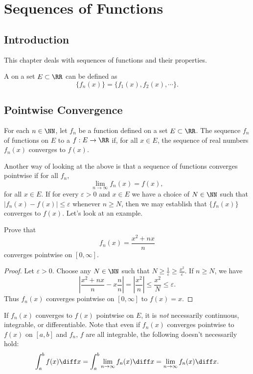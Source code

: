 \chapter{Sequences of Functions}

\section{Introduction}
This chapter deals with sequences of functions and their properties. 
\begin{definition}
	A  on a set $E \subset \RR$ can be defined as 
	\[ \{f_n(x)\} = \{f_1(x), f_2(x), \cdots \}. \]
\end{definition}
\section{Pointwise Convergence}

\begin{definition}
	For each $n \in \NN$, let $f_n$ be a function defined on a set $E \subset \RR$. The sequence $f_n$ of functions  on $E$ to a  $f: E \to \RR$ if, for all $x \in E$, the sequence of real numbers $f_n(x)$ converges to $f(x)$.
\end{definition}

Another way of looking at the above is that a sequence of functions converges pointwise if for all $f_n$, 
\[ \lim_{n\to\infty} f_n(x) = f(x), \] for all $x \in E$. If for every $\varepsilon > 0$ and $x \in E$ we have a choice of $N \in \NN$ such that $|f_n(x) - f(x)| \leq \varepsilon$ whenever $n \geq N$, then we may establish that $\{f_n(x)\}$ converges to $f(x)$. Let's look at an example. 

\begin{example}
	Prove that \[ f_n(x) = \dfrac{x^2 + nx}{n} \] converges pointwise on $[0, \infty]$. 
\end{example}
\begin{proof}
	Let $\varepsilon > 0$. Choose any $N \in \NN$ such that $N \geq \frac{1}{\varepsilon} \geq \frac{x^2}{\varepsilon}$. If $n \geq N$, we have 
	\[ \left | \dfrac{x^2 + nx}{n} - x\dfrac{n}{n} \right | = \left | \dfrac{x^2}{n} \right | \leq \dfrac{x^2}{N} \leq \varepsilon. \]
	Thus $f_n(x)$ converges pointwise on $[0,\infty]$ to $f(x) = x$. 
\end{proof}

If $f_n(x)$ converges to $f(x)$ pointwise on $E$, it is \emph{not} necessarily continuous, integrable, or differentiable. Note that even if $f_n(x)$ converges pointwise to $f(x)$ on $[a,b]$ and $f_n$, $f$ are all integrable, the following doesn't necessarily hold:
\[ \int_a^b f(x) \diff x = \int_a^b \lim_{n\to\infty} f_n(x) \diff x = \lim_{n\to\infty} f_n(x) \diff x. \]

